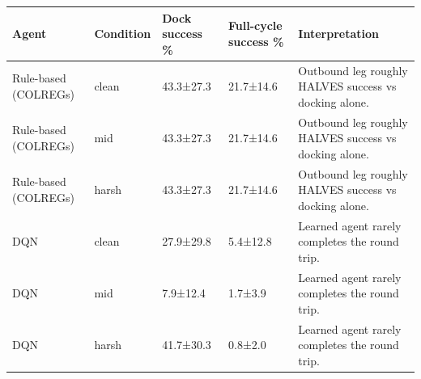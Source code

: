 \begin{tabular}{lllll}
\toprule
Agent & Condition & Dock success \% & Full-cycle success \% & Interpretation \\
\midrule
Rule-based (COLREGs) & clean & 43.3±27.3 & 21.7±14.6 & Outbound leg roughly HALVES success vs docking alone. \\
Rule-based (COLREGs) & mid & 43.3±27.3 & 21.7±14.6 & Outbound leg roughly HALVES success vs docking alone. \\
Rule-based (COLREGs) & harsh & 43.3±27.3 & 21.7±14.6 & Outbound leg roughly HALVES success vs docking alone. \\
DQN & clean & 27.9±29.8 & 5.4±12.8 & Learned agent rarely completes the round trip. \\
DQN & mid & 7.9±12.4 & 1.7±3.9 & Learned agent rarely completes the round trip. \\
DQN & harsh & 41.7±30.3 & 0.8±2.0 & Learned agent rarely completes the round trip. \\
\bottomrule
\end{tabular}
